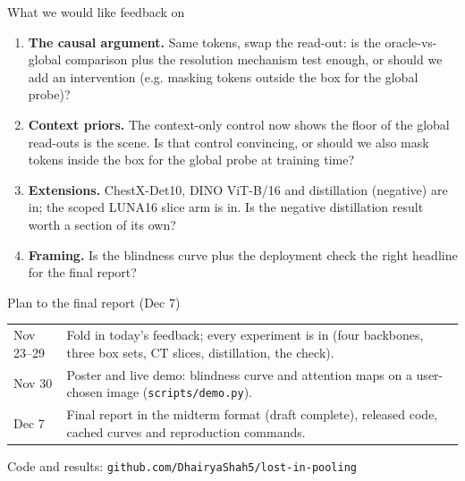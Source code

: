 \documentclass[10pt,aspectratio=169]{beamer}
\begin{document}
\begin{frame}{What we would like feedback on}
\begin{enumerate}
\item \textbf{The causal argument.} Same tokens, swap the read-out: is the oracle-vs-global comparison plus the resolution mechanism test enough, or should we add an intervention (e.g. masking tokens outside the box for the global probe)?
\item \textbf{Context priors.} The context-only control now shows the floor of the global read-outs is the scene. Is that control convincing, or should we also mask tokens inside the box for the global probe at training time?
\item \textbf{Extensions.} ChestX-Det10, DINO ViT-B/16 and distillation (negative) are in; the scoped LUNA16 slice arm is in. Is the negative distillation result worth a section of its own?
\item \textbf{Framing.} Is the blindness curve plus the deployment check the right headline for the final report?
\end{enumerate}
\end{frame}

\begin{frame}{Plan to the final report (Dec 7)}
\begin{tabular}{p{}p{}}\toprule
Nov 23--29 & Fold in today's feedback; every experiment is in (four backbones, three box sets, CT slices, distillation, the check). \\
Nov 30 & Poster and live demo: blindness curve and attention maps on a user-chosen image (\texttt{scripts/demo.py}). \\
Dec 7 & Final report in the midterm format (draft complete), released code, cached curves and reproduction commands. \\ \bottomrule
\end{tabular}
\vspace{4mm}

Code and results: \texttt{github.com/DhairyaShah5/lost-in-pooling}
\end{frame}
\end{document}
